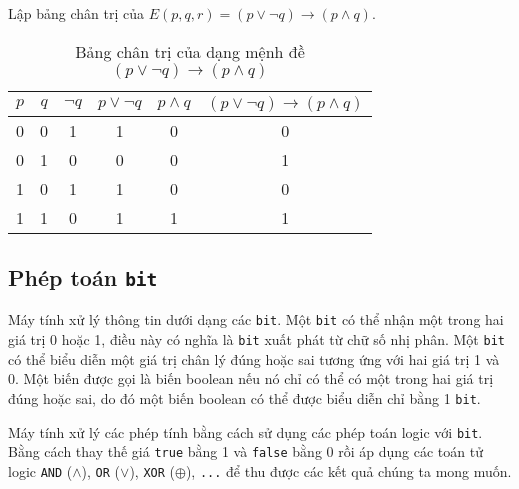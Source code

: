 \documentclass[11pt,fleqn]{book} %
\begin{document}
        
        
        \begin{example}
            Lập bảng chân trị của $E(p, q, r) = (p \lor \neg q) \to (p \land q)$.
        \end{example}
        \begin{table}[h!]
            \centering
            \setlength{\tabcolsep}{18pt}
            \begin{tabular}{c c c c c c}
                $p$ & $q$ & $\neg q$ & $p \lor \neg q$ & $p \land q$ &  $(p \lor \neg q) \to (p \land q)$\\ \hline
                0 & 0 & 1 & 1 & 0 & 0\\
                0 & 1 & 0 & 0 & 0 & 1\\
                1 & 0 & 1 & 1 & 0 & 0\\
                1 & 1 & 0 & 1 & 1 & 1
            \end{tabular}
            \caption{Bảng chân trị của dạng mệnh đề $(p \lor \neg q) \to (p \land q)$}
        \end{table}
    \subsection{Phép toán \texttt{bit}} 
        Máy tính xử lý thông tin dưới dạng các \texttt{bit}. Một \texttt{bit} có thể nhận một trong hai giá trị 0 hoặc 1, điều này có nghĩa là \texttt{bit} xuất phát từ chữ số nhị phân. Một \texttt{bit} có thể biểu diễn một giá trị chân lý đúng hoặc sai tương ứng với hai giá trị 1 và 0. Một biến được gọi là biến boolean nếu nó chỉ có thể có một trong hai giá trị đúng hoặc sai, do đó một biến boolean có thể được biểu diễn chỉ bằng 1 \texttt{bit}.
        
        Máy tính xử lý các phép tính bằng cách sử dụng các phép toán logic với \texttt{bit}. Bằng cách thay thế giá \texttt{true} bằng 1 và \texttt{false} bằng 0 rồi áp dụng các toán tử logic \texttt{AND} ($\land$), \texttt{OR} ($\lor$), \texttt{XOR} ($\oplus$), \texttt{...} để thu được các kết quả chúng ta mong muốn.
        
\end{document}
